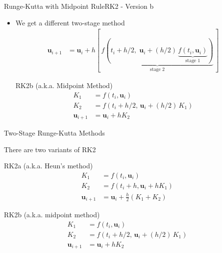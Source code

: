 \documentclass[10pt]{beamer}
\begin{document}

\begin{frame}{Runge-Kutta with Midpoint Rule}{RK2 - Version b}

\begin{itemize}
   \item We get a different two-stage method
   \begin{align*}
        \textbf{u}_{i+1}  &=  \textbf{u}_i + h[\, \underbrace{f(t_i + h/2,\; \textbf{u}_i + (h/2)\, \underbrace{f(t_i, \textbf{u}_i)}_{\text{stage 1}} )}_{\text{stage 2}}\, ]   
\end{align*}

    \begin{block}{RK2b (a.k.a. Midpoint Method)}
    \begin{align*}
        K_1 &= f(t_i,\textbf{u}_i)\\
        K_2 &= f(t_i + h/2,\, \textbf{u}_i + (h/2)\, K_1)\\
        \textbf{u}_{i+1} &= \textbf{u}_i + h K_2
    \end{align*}
    \end{block}
\end{itemize}
\end{frame}

\begin{frame}{Two-Stage Runge-Kutta Methods}

There are two variants of RK2

    \begin{block}{RK2a (a.k.a. Heun's method)}
    \vspace{-12pt}
    \begin{align*}
    K_1 &= f(t_i,\textbf{u}_i)\\
    K_2 &= f(t_i + h, \textbf{u}_i + h K_1)\\
       \textbf{u}_{i+1} &= \textbf{u}_i + \frac{h}{2}(K_1 + K_2)
    \end{align*}
    \end{block}

    \begin{block}{RK2b (a.k.a. midpoint method)}
    \begin{align*}
        K_1 &= f(t_i,\textbf{u}_i)\\
        K_2 &= f(t_i + h/2,\, \textbf{u}_i + (h/2)\, K_1)\\
        \textbf{u}_{i+1} &= \textbf{u}_i + h K_2
    \end{align*}
    \end{block}

\end{frame}
\end{document}
